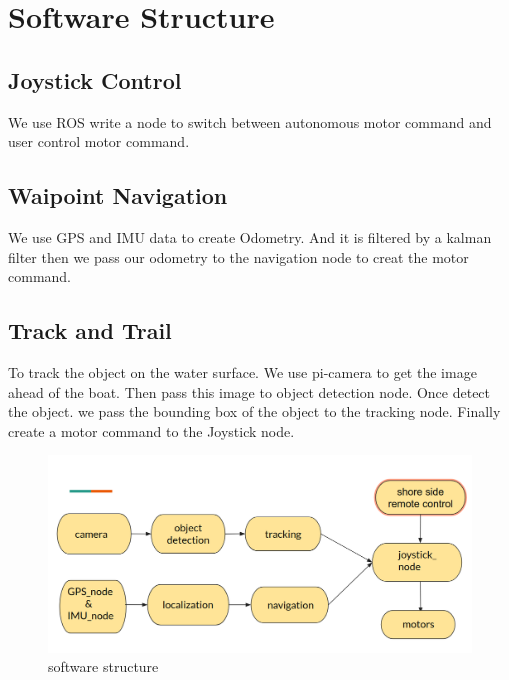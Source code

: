 \section{Software Structure}

\subsection{Joystick Control}

We use ROS write a node to switch between autonomous motor command and user control motor command.

\subsection{Waipoint Navigation}

We use GPS and IMU data to create Odometry. And it is filtered by a kalman filter then we pass our odometry to the navigation node to creat the motor command.

\subsection{Track and Trail}

To track the object on the water surface. We use pi-camera to get the image ahead of the boat. Then pass this image to object detection node. Once detect the object. we pass the bounding box of the object to the tracking node. Finally create a motor command to the Joystick node.

\begin{figure}[H]
	\includegraphics[width=1.0\columnwidth]{images/software_structure.png}
	\centering
	\caption{software structure}
	\label{figure:software_structure}
\end{figure}